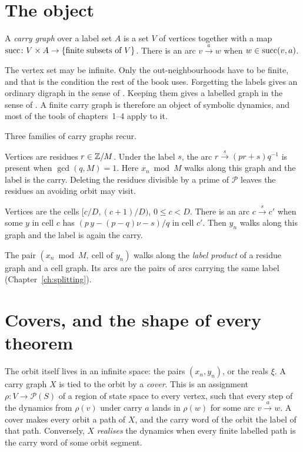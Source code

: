 \section{The object}

\begin{definition}
A \emph{carry graph} over a label set \(A\) is a set \(V\) of vertices together with a map
\(\operatorname{succ}\colon V\times A\to\{\text{finite subsets of }V\}\). There is an arc
\(v\xrightarrow{a}w\) when \(w\in\operatorname{succ}(v,a)\).
\end{definition}

The vertex set may be infinite. Only the out-neighbourhoods have to be finite, and that is
the condition the rest of the book uses. Forgetting the labels gives an ordinary digraph in the
sense of \cite[§1.2]{BJG09}. Keeping them gives a labelled graph in the sense of
\cite[§3.1]{LM95}. A finite carry graph is therefore an object of symbolic dynamics, and most
of the tools of \cite{LM95} chapters~1--4 apply to it.

Three families of carry graphs recur.
\begin{description}[style=nextline]
\item[Residue graphs.] Vertices are residues \(r\in\mathbb{Z}/M\). Under the label \(s\), the arc
  \(r\xrightarrow{s}(pr+s)q^{-1}\) is present when \(\gcd(q,M)=1\). Here \(x_n\bmod M\) walks
  along this graph and the label is the carry. Deleting the residues divisible by a prime of
  \(\mathcal P\) leaves the residues an avoiding orbit may visit.
\item[Cell graphs.] Vertices are the cells \([c/D,(c+1)/D)\), \(0\le c<D\). There is an arc
  \(c\xrightarrow{s}c'\) when some \(y\) in cell \(c\) has \((p\,y-(p-q)\nu-s)/q\) in cell
  \(c'\). Then \(y_n\) walks along this graph and the label is again the carry.
\item[Products.] The pair \((x_n\bmod M,\ \text{cell of }y_n)\) walks along the \emph{label
  product} of a residue graph and a cell graph. Its arcs are the pairs of arcs carrying the
  same label (Chapter~\ref{ch:splitting}).
\end{description}

\section{Covers, and the shape of every theorem}

The orbit itself lives in an infinite space: the pairs \((x_n,y_n)\), or the reals \(\xi\).
A carry graph \(X\) is tied to the orbit by a \emph{cover}. This is an assignment
\(\rho\colon V\to\mathcal P(S)\) of a region of state space to every vertex, such that every
step of the dynamics from \(\rho(v)\) under carry \(a\) lands in \(\rho(w)\) for some arc
\(v\xrightarrow{a}w\). A cover makes every orbit a path of \(X\), and the carry word of the
orbit the label of that path. Conversely, \(X\) \emph{realises} the dynamics when every finite
labelled path is the carry word of some orbit segment.

